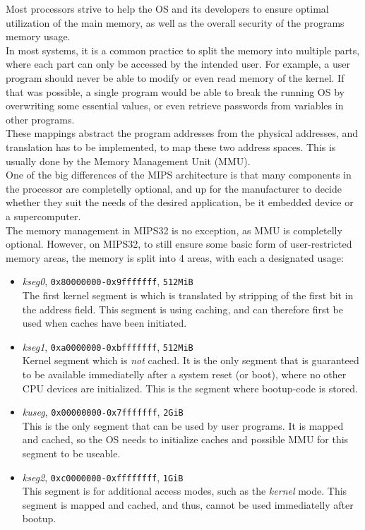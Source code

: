 \label{sec:mmu}
Most processors strive to help the OS and its developers to ensure optimal
utilization of the main memory, as well as the overall security of the programs
memory usage.\\
In most systems, it is a common practice to split the memory into multiple
parts, where each part can only be accessed by the intended user. For example,
a user program should never be able to modify or even read memory of the kernel.
If that was possible, a single program would be able to break the running OS by
overwriting some essential values, or even retrieve passwords from variables in
other programs.\\
These mappings abstract the program addresses from the physical addresses, and
translation has to be implemented, to map these two address spaces. This is
usually done by the Memory Management Unit (MMU).\\
One of the big differences of the MIPS architecture is that many components in
the processor are completelly optional, and up for the manufacturer to decide
whether they suit the needs of the desired application, be it embedded device
or a supercomputer.\\
The memory management in MIPS32 is no exception, as MMU is completelly optional.
However, on MIPS32, to still ensure some basic form of user-restricted memory areas, the
memory is split into 4 areas, with each a designated
usage:\cite{imgtec:Memory_Map}\cite{see_mips_run}
\begin{itemize}
\item \textit{kseg0}, \texttt{0x80000000-0x9fffffff}, \texttt{512MiB}\\
The first kernel segment is which is translated by stripping of the first bit
in the address field. This segment is using caching, and can therefore first
be used when caches have been initiated.\cite{see_mips_run}
\item \textit{kseg1}, \texttt{0xa0000000-0xbfffffff}, \texttt{512MiB}\\
Kernel segment which is \textit{not} cached. It is the only segment that is
guaranteed to be available immediatelly after a system reset (or boot), where
no other CPU devices are initialized.
This is the segment where bootup-code is stored.
\item \textit{kuseg}, \texttt{0x00000000-0x7fffffff}, \texttt{2GiB}\\
This is the only segment that can be used by user programs. It is mapped and
cached, so the OS needs to initialize caches and possible MMU for this segment
to be useable.
\item \textit{kseg2}, \texttt{0xc0000000-0xffffffff}, \texttt{1GiB}\\
This segment is for additional access modes, such as the \textit{kernel}
mode. This segment is mapped and cached, and thus, cannot be used immediatelly after
bootup.
\end{itemize}


